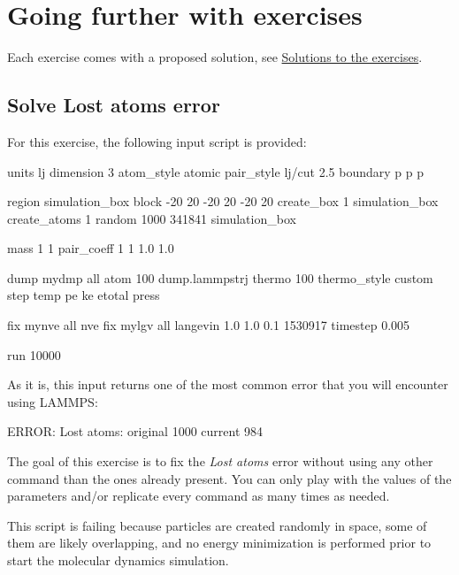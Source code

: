 \section{Going further with exercises}
\noindent Each exercise comes with a proposed solution, 
see \hyperref[solutions-label]{Solutions to the exercises}.

\subsection{Solve Lost atoms error}
\noindent For this exercise, the following input script is provided:

\begin{lcverbatim}
units lj
dimension 3
atom_style atomic
pair_style lj/cut 2.5
boundary p p p

region simulation_box block -20 20 -20 20 -20 20
create_box 1 simulation_box
create_atoms 1 random 1000 341841 simulation_box

mass 1 1
pair_coeff 1 1 1.0 1.0

dump mydmp all atom 100 dump.lammpstrj
thermo 100
thermo_style custom step temp pe ke etotal press

fix mynve all nve
fix mylgv all langevin 1.0 1.0 0.1 1530917
timestep 0.005

run 10000
\end{lcverbatim}

\noindent As it is, this input returns one of the most common
error that you will encounter using LAMMPS:

\begin{lcverbatim}
ERROR: Lost atoms: original 1000 current 984
\end{lcverbatim}

\noindent The goal of this exercise is to fix the \textit{Lost atoms} error without 
using any other command than the ones already present. You can 
only play with the values of the parameters and/or replicate every
command as many times as needed.

\begin{tcolorbox}[colback=mylightblue!5!white,colframe=mylightblue!75!black,title=Note]

\vspace{0.25cm} \noindent This script is failing because particles are created
randomly in space, some of them are likely overlapping,
and no energy minimization is performed prior
to start the molecular dynamics simulation.
\end{tcolorbox}

